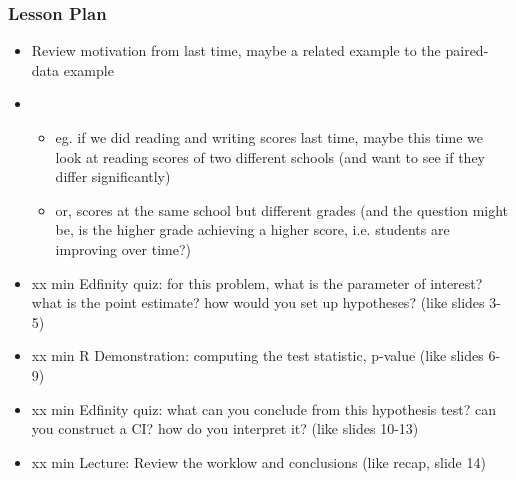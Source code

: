 \begin{frame}
    \frametitle{Lesson Plan}
    \begin{itemize}
        \item Review motivation from last time, maybe a related example to the paired-data example
        \item \begin{itemize}
            \item eg. if we did reading and writing scores last time, maybe this time we look at reading scores of two different schools (and want to see if they differ significantly)
            \item or, scores at the same school but different grades (and the question might be, is the higher grade achieving a higher score, i.e. students are improving over time?)
        \end{itemize}
        \item xx min Edfinity quiz: for this problem, what is the parameter of interest? what is the point estimate? how would you set up hypotheses? (like slides 3-5)
        \item xx min R Demonstration: computing the test statistic, p-value (like slides 6-9)
        \item xx min Edfinity quiz: what can you conclude from this hypothesis test? can you construct a CI? how do you interpret it? (like slides 10-13)
        \item xx min Lecture: Review the worklow and conclusions (like recap, slide 14)
    \end{itemize}
\end{frame}

